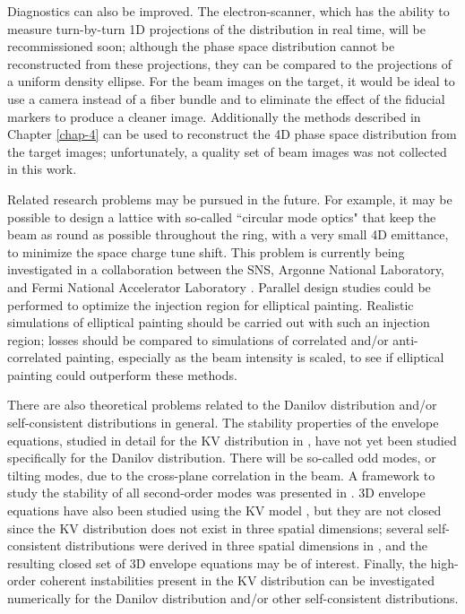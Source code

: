 Diagnostics can also be improved. The electron-scanner, which has the ability to measure turn-by-turn 1D projections of the distribution in real time, will be recommissioned soon; although the phase space distribution cannot be reconstructed from these projections, they can be compared to the projections of a uniform density ellipse. For the beam images on the target, it would be ideal to use a camera instead of a fiber bundle and to eliminate the effect of the fiducial markers to produce a cleaner image. Additionally the methods described in Chapter \ref{chap-4} can be used to reconstruct the 4D phase space distribution from the target images; unfortunately, a quality set of beam images was not collected in this work. 

Related research problems may be pursued in the future. For example, it may be possible to design a lattice with so-called ``circular mode optics" that keep the beam as round as possible throughout the ring, with a very small 4D emittance, to minimize the space charge tune shift. This problem is currently being investigated in a collaboration between the SNS, Argonne National Laboratory, and Fermi National Accelerator Laboratory \cite{Morozov-forthcoming}. Parallel design studies could be performed to optimize the injection region for elliptical painting. Realistic simulations of elliptical painting should be carried out with such an injection region; losses should be compared to simulations of correlated and/or anti-correlated painting, especially as the beam intensity is scaled, to see if elliptical painting could outperform these methods. 

There are also theoretical problems related to the Danilov distribution and/or self-consistent distributions in general. The stability properties of the envelope equations, studied in detail for the KV distribution in \cite{Lund2004}, have not yet been studied specifically for the Danilov distribution. There will be so-called odd modes, or tilting modes, due to the cross-plane correlation in the beam. A framework to study the stability of all second-order modes was presented in \cite{Yuan2017}. 3D envelope equations have also been studied using the KV model \cite{Qiang2018}, but they are not closed since the KV distribution does not exist in three spatial dimensions; several self-consistent distributions were derived in three spatial dimensions in \cite{Danilov2003}, and the resulting closed set of 3D envelope equations may be of interest. Finally, the high-order coherent instabilities present in the KV distribution can be investigated numerically for the Danilov distribution and/or other self-consistent distributions. 